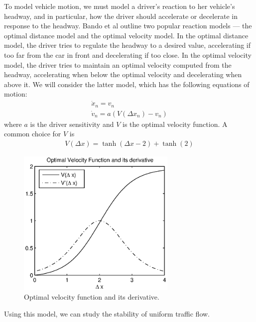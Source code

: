 \documentclass[10pt,twocolumn]{article}
\newcommand{\lm}{\fontfamily{\sfdefault}\selectfont}
\begin{document}
To model vehicle motion, we must model a driver's reaction to her vehicle's headway, and in particular, how the driver should accelerate or decelerate in response to the headway. Bando et al \cite{Bando} outline two popular reaction models --- the optimal distance model and the optimal velocity model. In the optimal distance model, the driver tries to regulate the headway to a desired value, accelerating if too far from the car in front and decelerating if too close. In the optimal velocity model, the driver tries to maintain an optimal velocity computed from the headway, accelerating when below the optimal velocity and decelerating when above it. We will consider the latter model, which has the following equations of motion:
\begin{gather}
\label{ovm1} \dot{x}_n = v_n\\
\label{ovm2} \dot{v}_n = a\left(V(\Delta x_n) - v_n\right)
\end{gather}
where $a$ is the driver sensitivity and $V$ is the optimal velocity function. A common choice for $V$ \cite{Bando} is
\begin{gather*}
V(\Delta x)=\tanh(\Delta x - 2) + \tanh(2)
\end{gather*}

\begin{figure}[!h]
\lm
\begin{center}
\includegraphics[width=3in]{vopt}
\end{center}
\caption{\label{fig:vopt} Optimal velocity function and its derivative.}
\end{figure}

Using this model, we can study the stability of uniform traffic flow.
\end{document}
